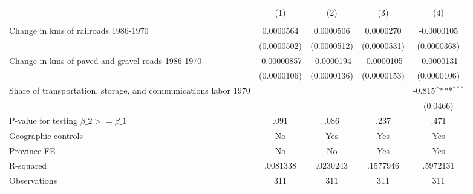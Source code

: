 {
\def\sym#1{\ifmmode^{#1}\else\(^{#1}\)\fi}
\begin{tabular}{l*{4}{c}}
\hline\hline
                &\multicolumn{1}{c}{(1)}&\multicolumn{1}{c}{(2)}&\multicolumn{1}{c}{(3)}&\multicolumn{1}{c}{(4)}\\
                &\multicolumn{1}{c}{}&\multicolumn{1}{c}{}&\multicolumn{1}{c}{}&\multicolumn{1}{c}{}\\
\hline
Change in kms of railroads 1986-1970&0.0000564         &0.0000506         &0.0000270         &-0.0000105         \\
                &(0.0000502)         &(0.0000512)         &(0.0000531)         &(0.0000368)         \\
[1em]
Change in kms of paved and gravel roads 1986-1970&-0.00000857         &-0.0000194         &-0.0000105         &-0.0000131         \\
                &(0.0000106)         &(0.0000136)         &(0.0000153)         &(0.0000106)         \\
[1em]
Share of transportation, storage, and communications labor 1970&                  &                  &                  &   -0.815\sym{***}\\
                &                  &                  &                  & (0.0466)         \\
\hline
P-value for testing $\beta\_{2} >= \beta\_{1}$&     .091         &     .086         &     .237         &     .471         \\
Geographic controls&       No         &      Yes         &      Yes         &      Yes         \\
Province FE     &       No         &       No         &      Yes         &      Yes         \\
R-squared       & .0081338         & .0230243         & .1577946         & .5972131         \\
Observations    &      311         &      311         &      311         &      311         \\
\hline\hline
\end{tabular}
}
